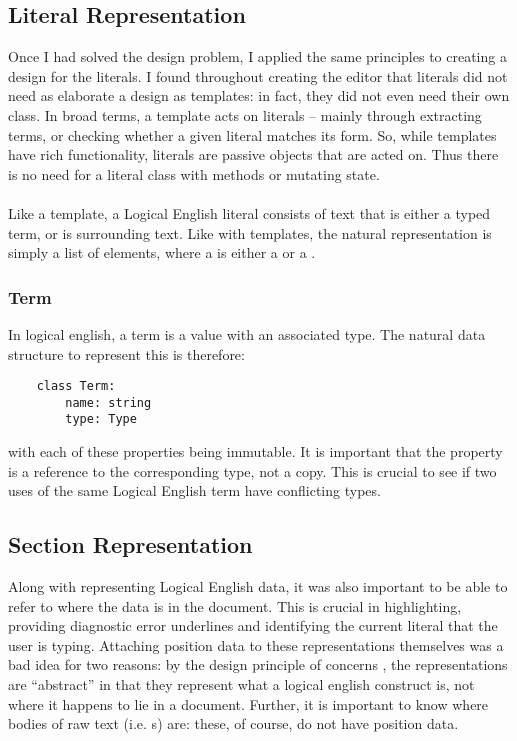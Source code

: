 \documentclass[../main.tex]{subfiles}
\begin{document}
\subsection{Literal Representation}
Once I had solved the  design problem, I applied the same principles to creating a design for the literals. I found throughout creating the editor that literals did not need as elaborate a design as templates: in fact, they did not even need their own class. In broad terms, a template acts on literals -- mainly through extracting terms, or checking whether a given literal matches its form. So, while templates have rich functionality, literals are passive objects that are acted on. Thus there is no need for a literal class with methods or mutating state.
\\
\\
Like a template, a Logical English literal consists of text that is either a typed term, or is surrounding text. Like with templates, the natural representation is simply a list of  elements, where a  is either a  or a .

\subsubsection{Term}
In logical english, a term is a value with an associated type. The natural data structure to represent this is therefore:
\begin{lstlisting}
    class Term:
        name: string
        type: Type
\end{lstlisting}
with each of these properties being immutable. It is important that the  property is a reference to the corresponding type, not a copy. This is crucial to see if two uses of the same Logical English term have conflicting types.

\subsection{Section Representation}
Along with representing Logical English data, it was also important to be able to refer to where the data is in the document. This is crucial in highlighting, providing diagnostic error underlines and identifying the current literal that the user is typing. Attaching position data to these representations themselves was a bad idea for two reasons: by the design principle of concerns , the representations are ``abstract'' in that they represent what a logical english construct is, not where it happens to lie in a document. Further, it is important to know where bodies of raw text (i.e. s) are: these, of course, do not have position data.
\end{document}
